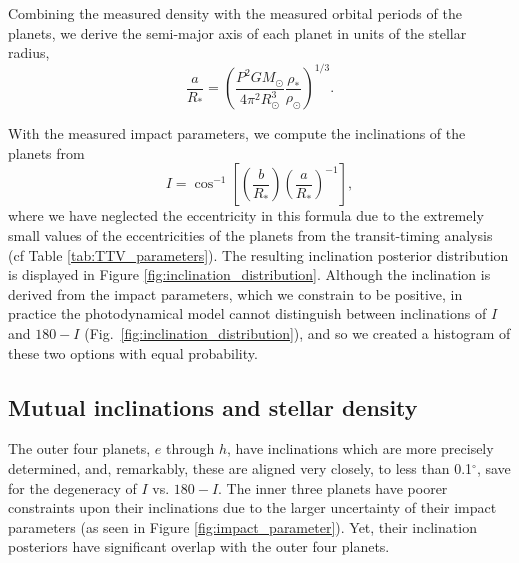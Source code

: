 \documentclass[twocolumn]{aastex63}
\begin{document}
Combining the measured density with the measured orbital periods of the planets,
we derive the semi-major axis of each planet in units of the stellar radius,
\begin{equation}
    \frac{a}{R_*} = \left(\frac{P^2 G M_\odot}{4\pi^2 R_\odot^3} \frac{\rho_*}{\rho_\odot}\right)^{1/3}.
\end{equation}

With the measured impact parameters, we compute the inclinations of the planets
from
\begin{equation}
    I = \cos^{-1}\left[ \left(\frac{b}{R_*}\right)
        \left(\frac{a}{R_*}\right)^{-1}\right],
\end{equation}
where we have neglected the eccentricity in this formula due to the extremely
small values of the eccentricities of the planets from the transit-timing
analysis (cf Table \ref{tab:TTV_parameters}).  The resulting inclination
posterior distribution is displayed in Figure \ref{fig:inclination_distribution}.
Although the inclination is derived from the impact parameters, which we constrain
to be positive, in practice the photodynamical model cannot distinguish between
inclinations of $I$ and $180-I$ (Fig.\ \ref{fig:inclination_distribution}), and so we created a histogram of these two options
with equal probability.

\subsection{Mutual inclinations and stellar density}

The outer four planets, $e$ through $h$, have inclinations which are more
precisely determined, and, remarkably, these are aligned
very closely, to less than 0.1$^\circ$, save for the degeneracy of $I$ vs.
$180-I$.  The inner three planets have poorer
constraints upon their inclinations due to the larger uncertainty of their
impact parameters (as seen in Figure \ref{fig:impact_parameter}).  Yet, their inclination posteriors have significant overlap
with the outer four planets.
\end{document}

